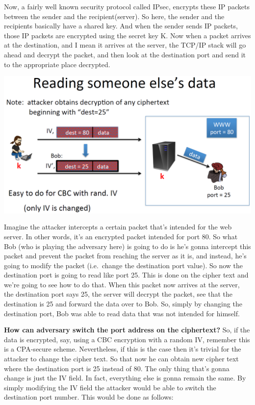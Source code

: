 \documentclass[11pt]{article}
\makeatletter
\def\maxwidth{\ifdim\Gin@nat@width>\linewidth\linewidth
    \else\Gin@nat@width\fi}
\let\Oldincludegraphics\includegraphics
\renewcommand{\includegraphics}[1]{\Oldincludegraphics[width=.8\maxwidth]{#1}}
\makeatother
\begin{document}
Now, a fairly well known security protocol called IPsec, encrypts these
IP packets between the sender and the recipient(server). So here, the
sender and the recipients basically have a shared key. And when the
sender sends IP packets, those IP packets are encrypted using the secret
key K. Now when a packet arrives at the destination, and I mean it
arrives at the server, the TCP/IP stack will go ahead and decrypt the
packet, and then look at the destination port and send it to the
appropriate place decrypted.

\includegraphics{./Images/ReadingSomeone'sData.png}

Imagine the attacker intercepts a certain packet that's intended for the
web server. In other words, it's an encrypted packet intended for port
80. So what Bob (who is playing the adversary here) is going to do is
he's gonna intercept this packet and prevent the packet from reaching
the server as it is, and instead, he's going to modify the packet
(i.e.~change the destination port value). So now the destination port is
going to read like port 25. This is done on the cipher text and we're
going to see how to do that. When this packet now arrives at the server,
the destination port says 25, the server will decrypt the packet, see
that the destination is 25 and forward the data over to Bob. So, simply
by changing the destination port, Bob was able to read data that was not
intended for himself.

\textbf{How can adversary switch the port address on the ciphertext?}
So, if the data is encrypted, say, using a CBC encryption with a random
IV, remember this is a CPA-secure scheme. Nevertheless, if this is the
case then it's trivial for the attacker to change the cipher text. So
that now he can obtain new cipher text where the destination port is 25
instead of 80. The only thing that's gonna change is just the IV field.
In fact, everything else is gonna remain the same. By simply modifying
the IV field the attacker would be able to switch the destination port
number. This would be done as follows:
\end{document}
